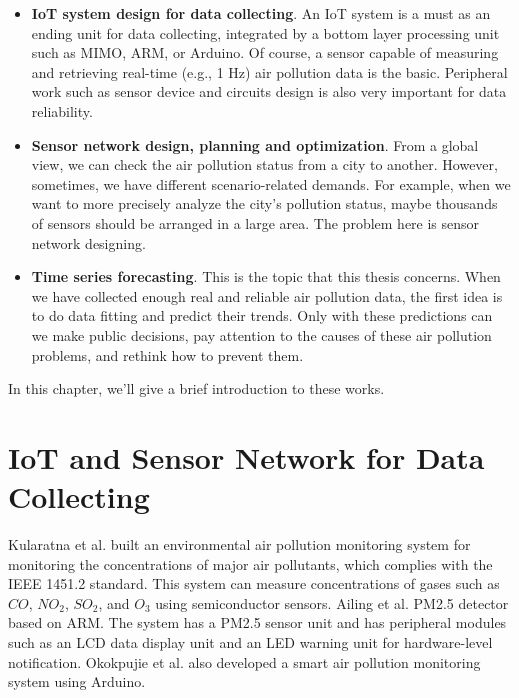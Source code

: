 \begin{itemize}
    \item \textbf{IoT system design for data collecting}. An IoT system is a must as an ending unit for data collecting, integrated by a bottom layer processing unit such as MIMO, ARM, or Arduino. Of course, a sensor capable of measuring and retrieving real-time (e.g., 1 Hz) air pollution data is the basic. Peripheral work such as sensor device and circuits design is also very important for data reliability.
    \item \textbf{Sensor network design, planning and optimization}. From a global view, we can check the air pollution status from a city to another. However, sometimes, we have different scenario-related demands. For example, when we want to more precisely analyze the city's pollution status, maybe thousands of sensors should be arranged in a large area. The problem here is sensor network designing.
    \item \textbf{Time series forecasting}. This is the topic that this thesis concerns. When we have collected enough real and reliable air pollution data, the first idea is to do data fitting and predict their trends. Only with these predictions can we make public decisions, pay attention to the causes of these air pollution problems, and rethink how to prevent them.
\end{itemize}

In this chapter, we'll give a brief introduction to these works.

\section{IoT and Sensor Network for Data Collecting}
Kularatna et al. \cite{kularatna2008environmental} built an environmental air pollution monitoring system for monitoring the concentrations of major air pollutants, which complies with the IEEE 1451.2 standard. This system can measure concentrations of gases such as $CO$, $NO_2$, $SO_2$, and $O_3$ using semiconductor sensors. Ailing et al. \cite{ailing2017design} PM2.5 detector based on ARM. The system has a PM2.5 sensor unit and has peripheral modules such as an LCD data display unit and an LED warning unit for hardware-level notification. Okokpujie et al. \cite{okokpujie2018smart} also developed a smart air pollution monitoring system using Arduino.

